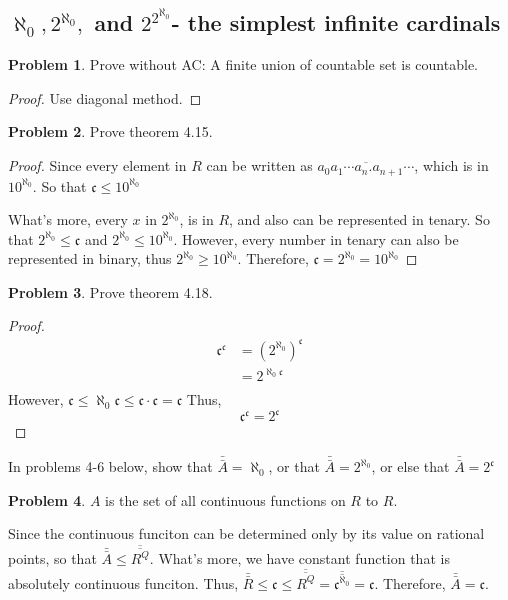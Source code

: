 \documentclass[a4paper,11pt]{article}%
\theoremstyle{remark}
\theoremstyle{definition}
\newtheorem{problem}{Problem}[subsection]
\begin{document}
\subsection{$\aleph_0,2^{\aleph_0},$ and $2^{2^{\aleph_0}}$- the simplest infinite cardinals}
\begin{problem}
    Prove without AC: A finite union of countable set is countable.
    \begin{proof}
        Use diagonal method.
    \end{proof}
\end{problem}
\begin{problem}
    Prove theorem 4.15.
    \begin{proof}
        Since every element in $R$ can be written as $\overline{a_0a_1\cdots a_n.a_{n+1}\cdots}$,
        which is in $10^{\aleph_0}$. So that $\mathfrak{c}\leq 10^{\aleph_0}$

        What's more, every $x$ in $2^{\aleph_0}$, is in $R$, and also can be represented in tenary.
        So that $2^{\aleph_0}\leq \mathfrak{c}$ and $2^{\aleph_0}\leq 10^{\aleph_0}$. However, every number in tenary can also be represented in 
        binary, thus $2^{\aleph_0}\geq 10^{\aleph_0}$. Therefore, $\mathfrak{c}=2^{\aleph_0}=10^{\aleph_0}$
    \end{proof}
\end{problem}
\begin{problem}
    Prove theorem 4.18.
    \begin{proof}
       \[ \begin{array}{rl}
           \mathfrak{c}^{\mathfrak{c}}&=(2^{\aleph_0})^{\mathfrak{c}}\\
                                      &=2^{\aleph_0\mathfrak{c}}\\
        \end{array}\]
        However, $\mathfrak{c}\leq\aleph_0\mathfrak{c}\leq \mathfrak{c}\cdot\mathfrak{c}=\mathfrak{c}$
        Thus,
        \[\mathfrak{c}^{\mathfrak{c}}=2^{\mathfrak{c}}\]
    \end{proof}
\end{problem}
In problems 4-6 below, show that $\bar{\bar{A}}=\aleph_0$, or that $\bar{\bar{A}}=2^{\aleph_0}$, or else that $\bar{\bar{A}}=2^{\mathfrak{c}}$
\begin{problem}
   $A$ is the set of all continuous functions on $R$ to $R$. 
   
   Since the continuous funciton can be determined only by its value on 
   rational points, so that $\bar{\bar{A}}\leq \overline{\overline{R^Q}}$.
   What's more, we have constant function that is absolutely continuous funciton.
   Thus, $\bar{\bar{R}}\leq\mathfrak{c}\leq\overline{\overline{R^Q}}=\overline{\overline{\mathfrak{c}^{\aleph_0}}}=\mathfrak{c}$.
   Therefore, $\bar{\bar{A}}=\mathfrak{c}$.
\end{problem}
\end{document}
